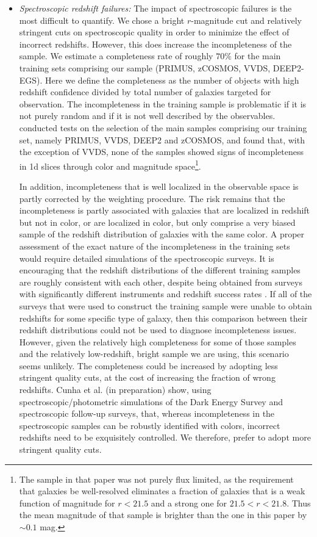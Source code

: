 \documentclass[12pt,preprint]{aastex}
\begin{document}
\begin{itemize}
\item {\it Spectroscopic redshift failures: } The impact of spectroscopic
failures is the most difficult to quantify.  We chose a bright $r$-magnitude
cut and relatively stringent cuts on spectroscopic quality in order to minimize
the effect of incorrect redshifts. However, this does increase the
incompleteness of the sample.  We estimate a completeness rate of roughly
$70\%$ for the main training sets comprising our sample (PRIMUS, zCOSMOS, VVDS,
DEEP2-EGS).  Here we define the completeness as the number of objects with high
redshift confidence divided by total number of galaxies targeted for
observation. The incompleteness in the training sample is problematic if it is
not purely random and if it is not well described by the observables.
\cite{Nakajima11} conducted tests on the selection of the main
samples comprising our training set, namely PRIMUS, VVDS, DEEP2 and zCOSMOS,
and found that, with the exception of VVDS, none of the samples showed signs of
incompleteness in 1d slices through color and magnitude
space\footnote{The sample in that paper was not purely flux limited,
  as the requirement that galaxies be well-resolved eliminates a
  fraction of galaxies that is a weak function of magnitude for
  $r<21.5$ and a strong one for $21.5<r<21.8$.  Thus the mean
  magnitude of that sample is brighter than the one in this paper by
  $\sim 0.1$ mag.}. 

In addition, incompleteness that is
well localized in the observable space is partly corrected by the weighting
procedure. The risk remains that the incompleteness is partly associated with
galaxies that are localized in redshift but not in color, or are localized in
color, but only comprise a very biased sample of the redshift distribution of
galaxies with the same color. A proper assessment of the exact nature of the
incompleteness in the training sets would require detailed simulations of the
spectroscopic surveys.  It is encouraging that the redshift distributions of
the different training samples are roughly consistent with each other, despite
being obtained from surveys with significantly different instruments and
redshift success rates \citep[Fig.  7 of][]{Nakajima11}.  
If all of the surveys that were used to construct the training sample
were unable to obtain redshifts for some specific type of galaxy, then
this comparison between their redshift distributions could not be used
to diagnose incompleteness issues.  However, given the relatively high
completeness for some of those samples and the relatively low-redshift, bright
sample we are using, this scenario seems unlikely.   The completeness
could be increased by adopting less stringent quality cuts, at the cost of
increasing the fraction of wrong redshifts.  Cunha et al. (in preparation)
show, using spectroscopic/photometric simulations of the Dark Energy Survey and
spectroscopic follow-up surveys, that, whereas incompleteness in the
spectroscopic samples can be robustly identified with colors, incorrect
redshifts need to be exquisitely controlled.  We therefore, prefer to adopt
more stringent quality cuts.




\end{itemize}
\end{document}
